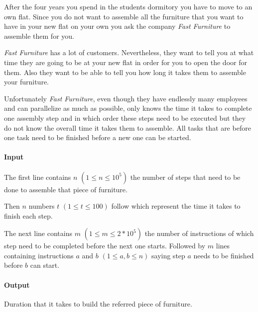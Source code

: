 



\makeheader

After the four years you spend in the students dormitory you have to move to an own flat. Since you do not want to
assemble all the furniture that you want to have in your new flat on your own you ask the company \textit{Fast Furniture}
to assemble them for you.

\textit{Fast Furniture} has a lot of customers. Nevertheless, they want to tell you at what time they are going to be at
your new flat in order for you to open the door for them.  Also they want to be able to tell you how long it takes them
to assemble your furniture.

Unfortunately \textit{Fast Furniture}, even though they have endlessly many employees and can parallelize
as much as possible, only knows the time it takes to complete one assembly step and in which
order these steps need to be executed but they do not know the overall time it takes them to assemble.
All tasks that are before one task need to be finished before a new one can be started.


\paragraph*{Input}

The first line contains $n$ $(1\leq n \leq 10^5)$ the number of steps that need to be done to assemble that piece of furniture.

Then $n$ numbers $t$ $(1\leq t \leq 100)$ follow which represent the time it takes to finish each step.

The next line contains $m$ $(1 \leq m \leq 2 * 10^5)$ the number of instructions of which step need to be completed before the next one starts. Followed
by $m$ lines containing instructions $a$ and $b$ $(1 \leq a, b \leq n)$ saying step $a$ needs to be finished before $b$ can start.

\paragraph*{Output}

Duration that it takes to build the referred piece of furniture.

\begin{samples}
\end{samples}

